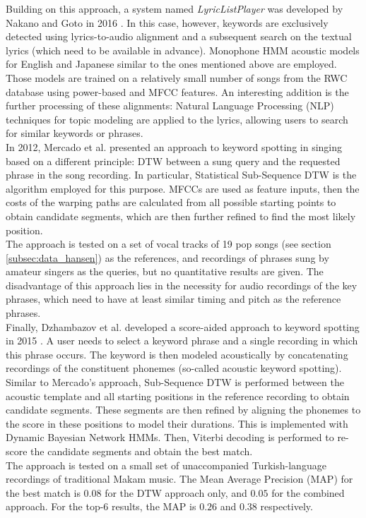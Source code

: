 Building on this approach, a system named \textit{LyricListPlayer} was developed by Nakano and Goto in 2016 \cite{lyriclistplayer}. In this case, however, keywords are exclusively detected using lyrics-to-audio alignment and a subsequent search on the textual lyrics (which need to be available in advance). Monophone HMM acoustic models for English and Japanese similar to the ones mentioned above are employed. Those models are trained on a relatively small number of songs from the RWC database \cite{rwc} using power-based and MFCC features. An interesting addition is the further processing of these alignments: Natural Language Processing (NLP) techniques for topic modeling are applied to the lyrics, allowing users to search for similar keywords or phrases.\\

In 2012, Mercado et al. presented an approach to keyword spotting in singing based on a different principle: DTW between a sung query and the requested phrase in the song recording. In particular, Statistical Sub-Sequence DTW is the algorithm employed for this purpose. MFCCs are used as feature inputs, then the costs of the warping paths are calculated from all possible starting points to obtain candidate segments, which are then further refined to find the most likely position.\\
The approach is tested on a set of vocal tracks of 19 pop songs (see section \ref{subsec:data_hansen}) as the references, and recordings of phrases sung by amateur singers as the queries, but no quantitative results are given. The disadvantage of this approach lies in the necessity for audio recordings of the key phrases, which need to have at least similar timing and pitch as the reference phrases.\\

Finally, Dzhambazov et al. developed a score-aided approach to keyword spotting in 2015 \cite{dzhambazov_ismir}. A user needs to select a keyword phrase and a single recording in which this phrase occurs. The keyword is then modeled acoustically by concatenating recordings of the constituent phonemes (so-called acoustic keyword spotting). Similar to Mercado's approach, Sub-Sequence DTW is performed between the acoustic template and all starting positions in the reference recording to obtain candidate segments. These segments are then refined by aligning the phonemes to the score in these positions to model their durations. This is implemented with Dynamic Bayesian Network HMMs. Then, Viterbi decoding is performed to re-score the candidate segments and obtain the best match.\\
The approach is tested on a small set of unaccompanied Turkish-language recordings of traditional Makam music. The Mean Average Precision (MAP) for the best match is $0.08$ for the DTW approach only, and $0.05$ for the combined approach. For the top-6 results, the MAP is $0.26$ and $0.38$ respectively.


